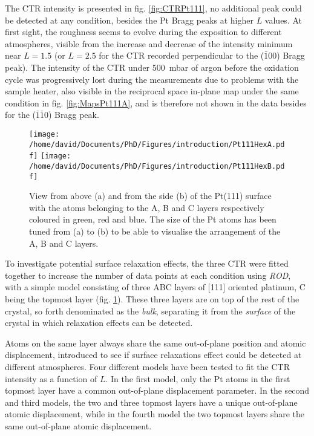 The CTR intensity is presented in fig. \ref{fig:CTRPt111}, no additional peak could be detected at any condition, besides the Pt Bragg peaks at higher $L$ values.
At first sight, the roughness seems to evolve during the exposition to different atmospheres, visible from the increase and decrease of the  intensity minimum near $L=1.5$ (or $L=2.5$ for the CTR recorded perpendicular to the ($\bar{1}$00) Bragg peak).
The intensity of the CTR under \qty{500}{\milli\bar} of argon before the oxidation cycle was progressively lost during the measurements due to problems with the sample heater, also visible in the reciprocal space in-plane map under the same condition in fig. \ref{fig:MapsPt111A}, and is therefore not shown in the data besides for the ($\bar{1}\bar{1}$0) Bragg peak.

\begin{figure}[!htb]
    \centering
    \texttt{[image: /home/david/Documents/PhD/Figures/introduction/Pt111HexA.pdf]}
    \texttt{[image: /home/david/Documents/PhD/Figures/introduction/Pt111HexB.pdf]}
    \caption{
        View from above (a) and from the side (b) of the Pt(111) surface with the atoms belonging to the A, B and C layers respectively coloured in green, red and blue.
        The size of the Pt atoms has been tuned from (a) to (b) to be able to visualise the arrangement of the A, B and C layers.
    }
    \label{fig:Pt111StructureSideAndTop}
\end{figure}

To investigate potential surface relaxation effects, the three CTR were fitted together to increase the number of data points at each condition using \textit{ROD}, with a simple model consisting of three ABC layers of [111] oriented platinum, C being the topmost layer (fig. \ref{fig:Pt111StructureSideAndTop}).
These three layers are on top of the rest of the crystal, so forth denominated as the \textit{bulk}, separating it from the \textit{surface} of the crystal in which relaxation effects can be detected.

Atoms on the same layer always share the same out-of-plane position and atomic displacement, introduced to see if surface relaxations effect could be detected at different atmospheres.
Four different models have been tested to fit the CTR intensity as a function of $L$.
In the first model, only the Pt atoms in the first topmost layer have a common out-of-plane displacement parameter.
In the second and third models, the two and three topmost layers have a unique out-of-plane atomic displacement, while in the fourth model the two topmost layers share the same out-of-plane atomic displacement.

